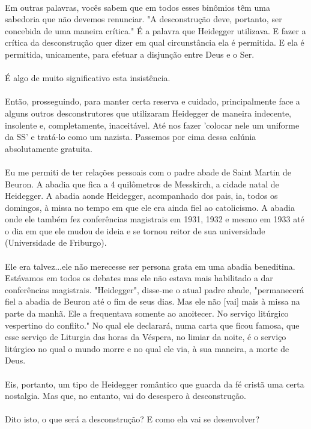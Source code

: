 \documentclass[10pt,a4paper]{book}
\begin{document}
	\\
	Em outras palavras, vocês sabem que em todos esses binômios têm uma sabedoria que não devemos renunciar. "A desconstrução deve, portanto, ser concebida de uma maneira crítica." É a palavra que Heidegger utilizava. E fazer a crítica da desconstrução quer dizer em qual circunstância ela é permitida. E ela é permitida, unicamente, para efetuar a disjunção entre Deus e o Ser.\\
	\\
	É algo de muito significativo esta insistência.\\
	\\
	Então, prosseguindo, para manter certa reserva e cuidado, principalmente face a alguns outros desconstrutores que utilizaram Heidegger de maneira indecente, insolente e, completamente, inaceitável. Até nos fazer 'colocar nele um uniforme da SS' e tratá-lo como um nazista. Passemos por cima dessa calúnia absolutamente gratuita.\\
	\\
	Eu me permiti de ter relações pessoais com o padre abade de Saint Martin de Beuron. A abadia que fica a 4 quilômetros de Messkirch, a cidade natal de Heidegger. A abadia aonde Heidegger, acompanhado dos pais, ia, todos os domingos, à missa no tempo em que ele era ainda fiel ao catolicismo. A abadia onde ele também fez conferências magistrais em 1931, 1932 e mesmo em 1933 até o dia em que ele mudou de ideia e se tornou reitor de sua universidade (Universidade de Friburgo).\\
	\\
	Ele era talvez...ele não merecesse ser persona grata em uma abadia beneditina. Estávamos em todos os debates mas ele não estava mais habilitado a dar conferências magistrais. "Heidegger", disse-me o atual padre abade, "permanecerá fiel a abadia de Beuron até o fim de seus dias. Mas ele não [vai] mais à missa na parte da manhã. Ele a frequentava somente ao anoitecer. No serviço litúrgico vespertino do conflito." No qual ele declarará, numa carta que ficou famosa, que esse serviço de Liturgia das horas da Véspera, no limiar da noite, é o serviço litúrgico no qual o mundo morre e no qual ele via, à sua maneira, a morte de Deus.\\
	\\
	Eis, portanto, um tipo de Heidegger romântico que guarda da fé cristã uma certa nostalgia. Mas que, no entanto, vai do desespero à desconstrução. \\
	\\
	Dito isto, o que será a desconstrução? E como ela vai se desenvolver?\\
\end{document}

